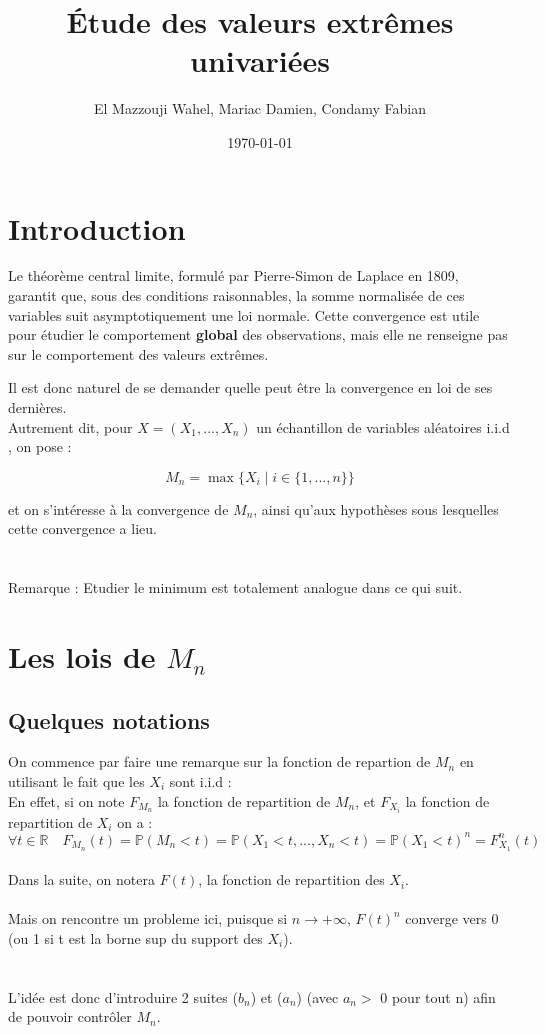 \documentclass{article}
\title{Étude des valeurs extrêmes univariées}
\author{El Mazzouji Wahel, Mariac Damien, Condamy Fabian}
\date{\today}
\begin{document}
\maketitle 
\newpage
\tableofcontents 
\newpage
\section{Introduction} 

Le théorème central limite, formulé par Pierre-Simon de Laplace en 1809, garantit que, sous des conditions raisonnables, la somme normalisée de ces variables suit asymptotiquement une loi normale. Cette convergence est utile pour étudier le comportement \textbf{global} des observations, mais elle ne renseigne pas sur le comportement des valeurs extrêmes.

Il est donc naturel de se demander quelle peut être la convergence en loi de ses dernières. 
\\
Autrement dit, pour \( X = (X_1, ..., X_n) \) un échantillon de variables aléatoires i.i.d , on pose :


\[
M_n = \max\{X_i \mid i \in \{1, ..., n\} \}
\]

et on s'intéresse à la convergence de \( M_n \), ainsi qu'aux hypothèses sous lesquelles cette convergence a lieu.
\\
\\
\\
Remarque : Etudier le minimum est totalement analogue dans ce qui suit.

\section{Les lois de $M_n$}

\subsection{Quelques notations }

On commence par faire une remarque sur la fonction de repartion de $M_n$ en utilisant le fait que les $X_i$ sont i.i.d :
\\
En effet, si on note $F_{M_n}$ la fonction de repartition de $M_n$, et $F_{X_i}$ la fonction de repartition de $X_i$ on a :
\[
\forall t \in \mathbb{R} \quad F_{M_n}(t) = \mathbb{P}(M_n < t) = \mathbb{P}(X_1 < t,...,X_n <t)=\mathbb{P}(X_1<t)^n = F_{X_1}^n(t) 
\]
\\
Dans la suite, on notera $F(t)$, la fonction de repartition des $X_i$.
\\
\\
Mais on rencontre un probleme ici, puisque si $n\to + \infty$, $F(t)^n$ converge vers 0 (ou 1 si t est la borne sup du support des $X_i$).
\\
\\
\\
L'idée est donc d'introduire 2 suites ($b_n$) et ($a_n$) (avec $a_n > $  0 pour tout n) afin de pouvoir contrôler $M_n$.
\end{document}
